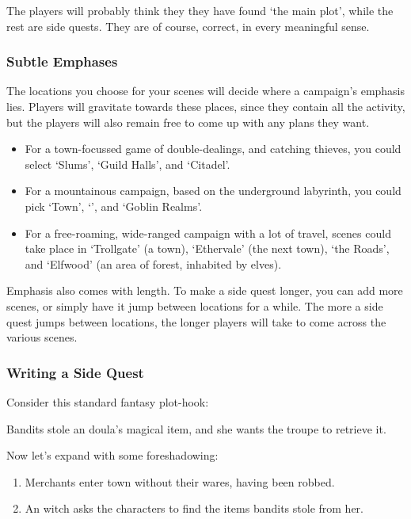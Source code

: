 \begin{multicols}{2}
The players will probably think they they have found `the main plot', while the rest are side quests.
They are of course, correct, in every meaningful sense.

\subsubsection{Subtle Emphases}

The locations you choose for your scenes will decide where a campaign's emphasis lies.
Players will gravitate towards these places, since they contain all the activity, but the players will also remain free to come up with any plans they want.

\begin{itemize}
  \item
  For a town-focussed game of double-dealings, and catching thieves, you could select `Slums', `Guild Halls', and `Citadel'.
  \item
  For a mountainous campaign, based on the underground labyrinth, you could pick `Town', `', and `Goblin Realms'.
  \item
  For a free-roaming, wide-ranged campaign with a lot of travel, scenes could take place in `Trollgate' (a town), `Ethervale' (the next town), `the Roads', and `Elfwood' (an area of forest, inhabited by elves).
\end{itemize}

\noindent
Emphasis also comes with length.
To make a side quest longer, you can add more scenes, or simply have it jump between locations for a while.
The more a side quest jumps between locations, the longer players will take to come across the various scenes.

\columnbreak
\subsubsection{Writing a Side Quest}

Consider this standard fantasy plot-hook:

\begin{exampletext}

  Bandits stole an doula's magical item, and she wants the troupe to retrieve it.

\end{exampletext}

\noindent
Now let's expand with some foreshadowing:

\begin{enumerate}
  \item
  Merchants enter town without their wares, having been robbed.
  \item
  An witch asks the characters to find the items bandits stole from her.
\end{enumerate}


\end{multicols}
